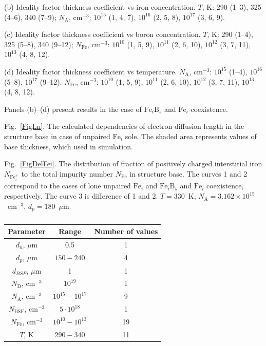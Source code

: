 ﻿\documentclass[12pt]{article}
\begin{document}
(b) Ideality factor thickness coefficient vs iron concentration.
$T$, K: 290 (1--3), 325 (4--6), 340 (7--9);
$N_\mathrm{A}$, cm$^{-3}$: $10^{15}$ (1, 4, 7), $10^{16}$ (2, 5, 8),  $10^{17}$ (3, 6, 9).

(c) Ideality factor thickness coefficient vs boron concentration.
$T$, K: 290 (1--4), 325 (5--8), 340 (9--12);
$N_\mathrm{Fe}$, cm$^{-3}$: $10^{10}$ (1, 5, 9), $10^{11}$ (2, 6, 10),  $10^{12}$ (3, 7, 11), $10^{13}$ (4, 8, 12).

(d) Ideality factor thickness coefficient vs temperature.
$N_\mathrm{A}$, cm$^{-3}$: $10^{15}$ (1--4), $10^{16}$ (5--8),  $10^{17}$ (9--12).
$N_\mathrm{Fe}$, cm$^{-3}$: $10^{10}$ (1, 5, 9), $10^{11}$ (2, 6, 10),  $10^{12}$ (3, 7, 11), $10^{13}$ (4, 8, 12).

Panels (b)--(d) present results in  the case of $\mathrm{Fe}_i\mathrm{B}_s$ and $\mathrm{Fe}_i$ coexistence.

 Fig.~\ref{FigLn}.
The calculated dependencies of electron diffusion length in the structure base
in case of unpaired $\mathrm{Fe}_i$ sole.
The shaded area represents values of base thickness, which used in simulation.

 Fig.~\ref{FigDelFei}.
The distribution of fraction of positively charged interstitial iron $N_{\mathrm{Fe}_i^+}$ to the total
impurity number $N_{\mathrm{Fe}}$ in structure base.
The curves 1 and 2 correspond to the cases of lone unpaired $\mathrm{Fe}_i$ and $\mathrm{Fe}_i\mathrm{B}_s$ and $\mathrm{Fe}_i$ coexistence,
respectively.
The curve 3 is difference of 1 and 2.
$T=330$~K, $N_\mathrm{A}=3.162\times10^{15}$~cm$^{-3}$, $d_p=180$~$\mu$m.



\newpage

\begin{table}
\caption{\label{tabParametr}
}
\begin{tabular}{|c|c|c|}
\hline
Parameter& Range& Number of values\\
\hline
$d_n$, $\mu$m&0.5&1\\
\hline
$d_p$, $\mu$m&$150-240$&4\\
\hline
$d_{BSF}$, $\mu$m&1&1\\
\hline
$N_\mathrm{D}$, cm$^{-3}$&$10^{19}$&1\\
\hline
$N_\mathrm{A}$, cm$^{-3}$&$10^{15}-10^{17}$&9\\
\hline
$N_\mathrm{BSF}$, cm$^{-3}$&$5\cdot10^{18}$&1\\
\hline
$N_\mathrm{Fe}$, cm$^{-3}$&$10^{10}-10^{13}$&19\\
\hline
$T$, K&$290-340$&11\\
\hline
\end{tabular}
\end{table}
\end{document}
